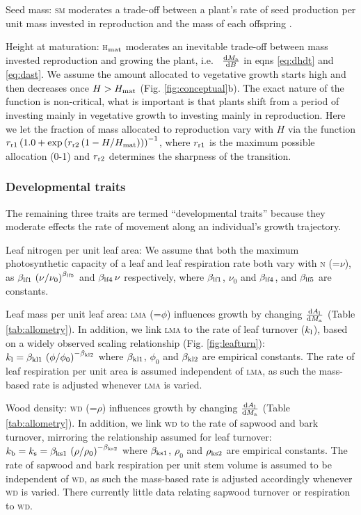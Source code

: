 \documentclass[9pt,twocolumn,twoside,lineno]{pnas-new}
\newcommand{\lma}{\textsc{lma}}
\newcommand{\wood}{\textsc{wd}}
\newcommand{\seed}{\textsc{sm}}
\newcommand{\hmat}{\textsc{h}$_{\rm mat}$}
\newcommand{\nitrogen}{\textsc{n}}
\begin{document}
Seed mass: {\seed} moderates a trade-off between a plant's rate of seed production per unit mass invested in reproduction and the mass of each offspring  \citep{Moles-2006}.

Height at maturation: {\hmat} moderates an inevitable trade-off between mass invested reproduction and growing the plant, i.e.~ $\frac{{\rm d}M_{\rm a}}{{\rm d}B}$ in eqns \ref{eq:dhdt} and \ref{eq:dast}. We assume the amount allocated to vegetative growth starts high and then decreases once $H > H_{{\rm mat}}$  (Fig. \ref{fig:conceptual}b). The exact nature of the function is non-critical, what is important is that plants shift from a period of investing mainly in vegetative growth to investing mainly in reproduction. Here we let the fraction of mass allocated to reproduction vary with $H$ via the function $r_{\rm r1}  \left(1.0 + \exp\left(r_{\rm r2} \left(1 - H / H_{{\rm mat}}\right)\right)\right)^{-1}$, where $r_{\rm r1}$ is the maximum possible allocation (0-1) and $r_{\rm r2}$ determines the sharpness of the transition. 

\subsubsection{Developmental traits} The remaining three traits are termed ``developmental traits'' because they moderate effects the rate of movement along an individual's growth trajectory. 

Leaf nitrogen per unit leaf area: We assume that both the maximum photosynthetic capacity of a leaf and leaf respiration rate both vary with {\nitrogen} (=$\nu$), as $\beta_{{\rm lf1}} \, \left(\nu / \nu_0 \right)^{\beta_{{\rm lf5}}}$ and $\beta_{{\rm lf4}}\, \nu$ respectively, where $\beta_{{\rm lf1}}$, $\nu_0$ and $\beta_{{\rm lf4}}$, and $\beta_{{\rm lf5}}$ are constants.

Leaf mass per unit leaf area: {\lma} (=$\phi$) influences growth by changing $\frac{{\rm d}A_{\rm l}}{{\rm d}M_{\rm a}}$ (Table \ref{tab:allometry}). In addition, we link {\lma} to the rate of leaf turnover ($k_{\rm l}$), based on a widely observed scaling relationship \citep{Wright-2004} (Fig. \ref{fig:leafturn}): $k_{\rm l} = \beta_{{\rm kl1}} \, \left(\phi/\phi_0\right)^{-\beta_{{\rm kl2}}}$ where $\beta_{{\rm kl1}}$, $\phi_0$ and $\beta_{{\rm kl2}}$ are empirical constants. The rate of leaf respiration per unit area is assumed independent of {\lma}\citep{Wright-2004}, as such the mass-based rate is adjusted whenever {\lma} is varied.

Wood density: {\wood} (=$\rho$) influences growth by changing $\frac{{\rm d}A_{\rm l}}{{\rm d}M_{\rm a}}$ (Table \ref{tab:allometry}). In addition, we link {\wood} to the rate of sapwood and bark turnover, mirroring the relationship assumed for leaf turnover: $k_{\rm b} = k_{\rm s} = \beta_{{\rm ks1}} \, \left(\rho / \rho_0\right)^{-\beta_{{\rm ks2}}}$ where $\beta_{{\rm ks1}}$, $\rho_0$ and $\rho_{{\rm ks2}}$ are empirical constants. The rate of sapwood and bark respiration per unit stem volume is assumed to be independent of {\wood}, as such the mass-based rate is adjusted accordingly whenever {\wood} is varied. There currently little data relating sapwood turnover or respiration to {\wood}.
\end{document}
